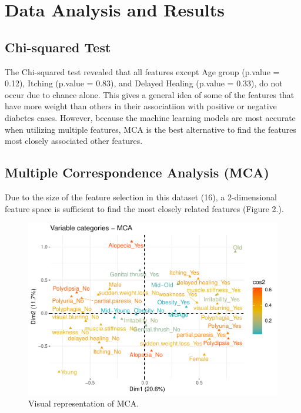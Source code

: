 \documentclass[
]{article}
\begin{document}
\hypertarget{data-analysis-and-results}{%
\section{Data Analysis and Results}\label{data-analysis-and-results}}

\hypertarget{chi-squared-test}{%
\subsection{Chi-squared Test}\label{chi-squared-test}}

The Chi-squared test revealed that all features except Age group
(p.value = 0.12), Itching (p.value = 0.83), and Delayed Healing (p.value
= 0.33), do not occur due to chance alone. This gives a general idea of
some of the features that have more weight than others in their
associatiion with positive or negative diabetes cases. However, because
the machine learning models are most accurate when utilizing multiple
features, MCA is the best alternative to find the features most closely
associated other features.

\hypertarget{multiple-correspondence-analysis-mca}{%
\subsection{Multiple Correspondence Analysis
(MCA)}\label{multiple-correspondence-analysis-mca}}

Due to the size of the feature selection in this dataset (16), a
2-dimensional feature space is sufficient to find the most closely
related features (Figure 2.).

\begin{figure}[h!]
\centering
\includegraphics{FinalArticle_files/figure-latex/unnamed-chunk-3-1.pdf}
\caption{Visual representation of MCA.}
\end{figure}
\end{document}
